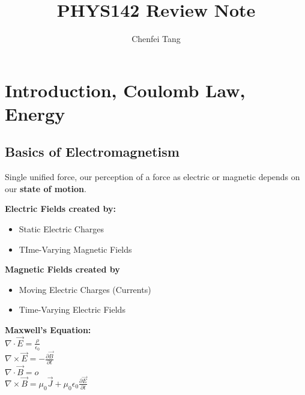 \documentclass[oneside]{book}
\begin{document}
\title{PHYS142 Review Note}
\author{Chenfei Tang}
\maketitle

\chapter{Introduction, Coulomb Law, Energy}
\section{Basics of Electromagnetism}
Single unified force, our perception of a force as electric or magnetic depends on our \textbf{state of motion}.

\begin{center}
\textbf{Electric Fields created by:}
\begin{itemize}
    \centering
    \item Static Electric Charges
    \item TIme-Varying Magnetic Fields
\end{itemize}


\textbf{Magnetic Fields created by}
\begin{itemize}
    \centering
    \item Moving Electric Charges (Currents)
    \item Time-Varying Electric Fields
\end{itemize}

\textbf{Maxwell's Equation:}\\
    \centering
    $\nabla\cdot \Vec{E}=\frac{\rho}{\epsilon_0}$\\
    $\nabla\times \Vec{E}=-\frac{\partial \vec{B}}{\partial t}$\\
    $\nabla\cdot \Vec{B}=o$\\
    $\nabla\times \Vec{B}= \mu_0 \vec{J}+\mu_0 \epsilon_0 \frac{\partial \vec{E}}{\partial t}$
\end{center}
\end{document}
